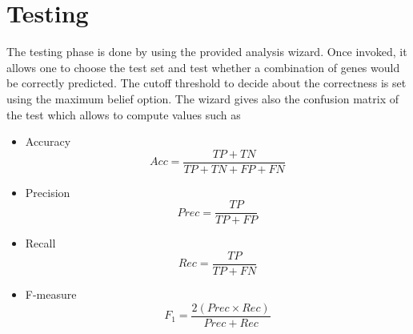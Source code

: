 \section*{Testing}
The testing phase is done by using the provided analysis wizard. \newline
Once invoked, it allows one to choose the test set and test whether a combination of genes would be correctly predicted.\newline
The cutoff threshold to decide about the correctness is set using the maximum belief option. \newline
The wizard gives also the confusion matrix of the test which allows to compute values such as 
\begin{itemize}
	\item Accuracy
		\[Acc=\frac{TP+TN}{TP+TN+FP+FN}\]
	\item Precision
		\[Prec=\frac{TP}{TP+FP}\]
	\item Recall 
		\[Rec=\frac{TP}{TP+FN}\]
	\item F-measure
		\[F_1=\frac{2(Prec\times Rec)}{Prec+ Rec}\]
\end{itemize}

%
%
%
